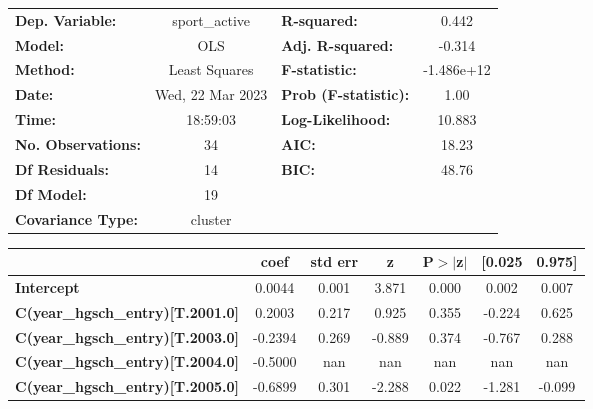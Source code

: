 \begin{center}
\begin{tabular}{lclc}
\toprule
\textbf{Dep. Variable:}                  &  sport\_active   & \textbf{  R-squared:         } &     0.442   \\
\textbf{Model:}                          &       OLS        & \textbf{  Adj. R-squared:    } &    -0.314   \\
\textbf{Method:}                         &  Least Squares   & \textbf{  F-statistic:       } & -1.486e+12  \\
\textbf{Date:}                           & Wed, 22 Mar 2023 & \textbf{  Prob (F-statistic):} &     1.00    \\
\textbf{Time:}                           &     18:59:03     & \textbf{  Log-Likelihood:    } &    10.883   \\
\textbf{No. Observations:}               &          34      & \textbf{  AIC:               } &     18.23   \\
\textbf{Df Residuals:}                   &          14      & \textbf{  BIC:               } &     48.76   \\
\textbf{Df Model:}                       &          19      & \textbf{                     } &             \\
\textbf{Covariance Type:}                &     cluster      & \textbf{                     } &             \\
\bottomrule
\end{tabular}
\begin{tabular}{lcccccc}
                                         & \textbf{coef} & \textbf{std err} & \textbf{z} & \textbf{P$> |$z$|$} & \textbf{[0.025} & \textbf{0.975]}  \\
\midrule
\textbf{Intercept}                       &       0.0044  &        0.001     &     3.871  &         0.000        &        0.002    &        0.007     \\
\textbf{C(year\_hgsch\_entry)[T.2001.0]} &       0.2003  &        0.217     &     0.925  &         0.355        &       -0.224    &        0.625     \\
\textbf{C(year\_hgsch\_entry)[T.2003.0]} &      -0.2394  &        0.269     &    -0.889  &         0.374        &       -0.767    &        0.288     \\
\textbf{C(year\_hgsch\_entry)[T.2004.0]} &      -0.5000  &          nan     &       nan  &           nan        &          nan    &          nan     \\
\textbf{C(year\_hgsch\_entry)[T.2005.0]} &      -0.6899  &        0.301     &    -2.288  &         0.022        &       -1.281    &       -0.099     \\

\end{tabular}
\end{center}
